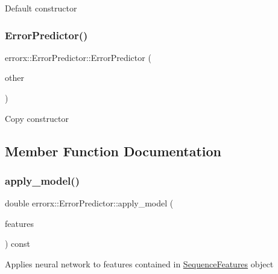 Default constructor \mbox{\label{classerrorx_1_1_error_predictor_a4604f7bd37aadcad0851d4a2ccfb47f0}} 
\subsubsection{\texorpdfstring{Error\+Predictor()}{ErrorPredictor()}\hspace{0.1cm}{\footnotesize\ttfamily [2/2]}}
{\footnotesize\ttfamily errorx\+::\+Error\+Predictor\+::\+Error\+Predictor (\begin{DoxyParamCaption}\item[{\mbox{\hyperlink{classerrorx_1_1_error_predictor}{Error\+Predictor}} const \&}]{other }\end{DoxyParamCaption})}

Copy constructor 

\subsection{Member Function Documentation}
\mbox{\label{classerrorx_1_1_error_predictor_a14bf5197cc1ce818fdc5ef44579ad1ef}} 
\subsubsection{\texorpdfstring{apply\+\_\+model()}{apply\_model()}\hspace{0.1cm}{\footnotesize\ttfamily [1/2]}}
{\footnotesize\ttfamily double errorx\+::\+Error\+Predictor\+::apply\+\_\+model (\begin{DoxyParamCaption}\item[{\mbox{\hyperlink{classerrorx_1_1_sequence_features}{Sequence\+Features}} const \&}]{features }\end{DoxyParamCaption}) const}

Applies neural network to features contained in \mbox{\hyperlink{classerrorx_1_1_sequence_features}{Sequence\+Features}} object


